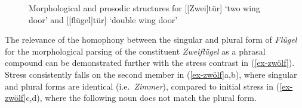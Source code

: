 \documentclass[output=paper
 ,nobabel
 ,draftmode
 ,colorlinks, citecolor=brown
]{langscibook}
\begin{document}
\begin{figure}
\begin{subfigure}{.49\textwidth}
\centering
{}
\end{subfigure}
%
\begin{subfigure}{.49\textwidth}
\centering
{}
\end{subfigure}

\vspace{10pt}
\begin{subfigure}{.49\textwidth}
\centering
{}
\end{subfigure}
%
\begin{subfigure}{.49\textwidth}
\centering
{}
\end{subfigure}
\caption{Morphological and prosodic structures for [[Zwei]tür]
`two wing door' %
and [[flügel]tür] `double wing door'
}\label{fig-doppelbaum}
\end{figure}


The relevance of the homophony between the singular and plural form of \emph{Flügel} for the
morphological parsing of the constituent \emph{Zweiflügel} as a phrasal compound can be demonstrated
further with the stress contrast in (\ref{ex-zwölf}). Stress consistently falls on the second member
in (\ref{ex-zwölf}a,b), where singular and plural forms are identical
(i.e.\ \emph{Zimmer}), compared to initial stress in (\ref{ex-zwölf}c,d), where the following noun
does not match the plural form.
\end{document}
